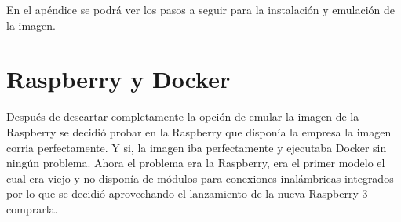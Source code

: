 En el apéndice se podrá ver los pasos a seguir para la instalación y emulación de la imagen. 

\section{Raspberry y Docker}

Después de descartar completamente la opción de emular la imagen de la Raspberry se decidió probar en la Raspberry que disponía la empresa la imagen corria perfectamente. Y si, la imagen iba perfectamente y ejecutaba Docker sin ningún problema. Ahora el problema era la Raspberry, era el primer modelo el cual era viejo y no disponía de módulos para conexiones inalámbricas integrados por lo que se decidió aprovechando el lanzamiento de la nueva Raspberry 3 comprarla.
